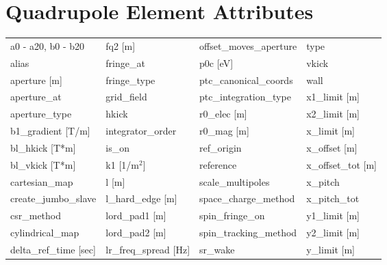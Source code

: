  \section{Quadrupole Element Attributes}
 \label{s:list.quadrupole}

 \begin{tabular}{llll} \toprule
a0 - a20, b0 - b20             & fq2 [m]                        & offset_moves_aperture          & type                           \\
alias                          & fringe_at                      & p0c [eV]                       & vkick                          \\
aperture [m]                   & fringe_type                    & ptc_canonical_coords           & wall                           \\
aperture_at                    & grid_field                     & ptc_integration_type           & x1_limit [m]                   \\
aperture_type                  & hkick                          & r0_elec [m]                    & x2_limit [m]                   \\
b1_gradient [T/m]              & integrator_order               & r0_mag [m]                     & x_limit [m]                    \\
bl_hkick [T*m]                 & is_on                          & ref_origin                     & x_offset [m]                   \\
bl_vkick [T*m]                 & k1 [1/m$^2$]                   & reference                      & x_offset_tot [m]               \\
cartesian_map                  & l [m]                          & scale_multipoles               & x_pitch                        \\
create_jumbo_slave             & l_hard_edge [m]                & space_charge_method            & x_pitch_tot                    \\
csr_method                     & lord_pad1 [m]                  & spin_fringe_on                 & y1_limit [m]                   \\
cylindrical_map                & lord_pad2 [m]                  & spin_tracking_method           & y2_limit [m]                   \\
delta_ref_time [sec]           & lr_freq_spread [Hz]            & sr_wake                        & y_limit [m]                    \\

\end{tabular}

